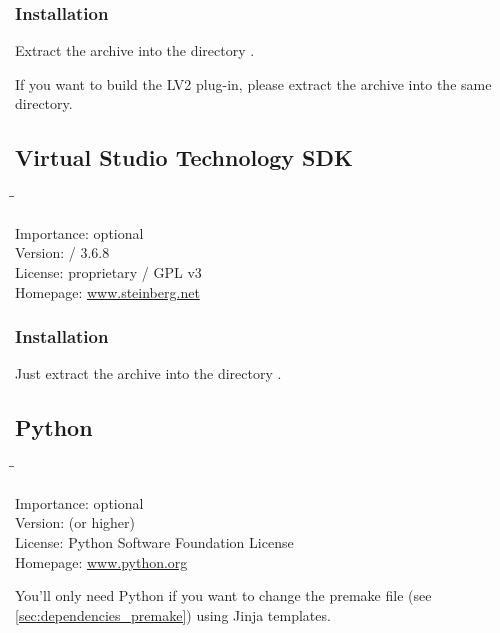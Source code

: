 \subsubsection{Installation}

Extract the archive into the directory .

If you want to build the LV2 plug-in, please extract the archive
 into the same directory.

\subsection{Virtual Studio Technology SDK}

\begin{tabbing}
  \hspace*{6em}\=\=\kill

  Importance:  \> optional \\
  Version:      / 3.6.8 \\
  License:     \> proprietary / GPL v3 \\
  Homepage:    \> \href{http://www.steinberg.net/en/company/developer.html}{www.steinberg.net}
\end{tabbing}

\subsubsection{Installation}

Just extract the archive into the directory
.

\subsection{Python}

\begin{tabbing}
  \hspace*{6em}\=\=\kill

  Importance:  \> optional \\
  Version:      (or higher) \\
  License:     \> Python Software Foundation License \\
  Homepage:    \> \href{http://www.python.org/}{www.python.org}
\end{tabbing}

You'll only need Python if you want to change the premake file (see
\ref{sec:dependencies_premake}) using Jinja templates.

